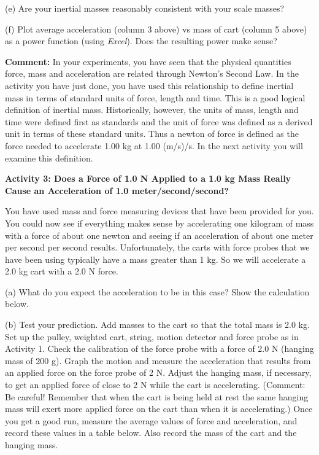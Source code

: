 {(e) Are your inertial masses reasonably consistent with your scale masses?
\answerspace{10mm}

(f) Plot average acceleration (column 3 above) vs mass of cart (column 5 above) as a power function (using \textit{Excel}). Does the resulting power make sense?
\answerspace{5mm}

\textbf{Comment:} In your experiments, you have seen that the physical quantities
force, mass and acceleration are related through Newton's Second Law. In the
activity you have just done, you have used this relationship to define inertial
mass in terms of standard units of force, length and time. This is a good logical
definition of inertial mass. Historically, however, the units of mass, length
and time were defined first as standards and the unit of force was defined as
a derived unit in terms of these standard units. Thus a newton of force is defined
as the force needed to accelerate 1.00 kg at 1.00 (m/s)/s. In the next activity
you will examine this definition. 

\pagebreak[2]
\textbf{Activity 3: Does a Force of 1.0 N Applied to a 1.0 kg Mass Really Cause
an Acceleration of 1.0 meter/second/second?} 

You have used mass and force measuring devices that have been provided for you.
You could now see if everything makes sense by accelerating one kilogram of
mass with a force of about one newton and seeing if an acceleration of about
one meter per second per second results. Unfortunately, the carts with force
probes that we have been using typically have a mass greater than 1 kg. So we
will accelerate a 2.0 kg cart with a 2.0 N force.

(a) What do you expect the acceleration to be in this case? Show the calculation
below.
\vspace{20mm}

(b) Test your prediction. Add masses to the cart so that the total mass is 2.0
kg. Set up the pulley, weighted cart, string, motion detector and force probe
as in Activity 1. Check the calibration of the force probe with a force of 2.0
N (hanging mass of 200 g). Graph the motion and measure the acceleration that
results from an applied force on the force probe of 2 N. Adjust the hanging
mass, if necessary, to get an applied force of close to 2 N while the cart is
accelerating. (Comment: Be careful! Remember that when the cart is being held
at rest the same hanging mass will exert more applied force on the cart than
when it is accelerating.) Once you get a good run, measure the average values
of force and acceleration, and record these values in a table below. Also record
the mass of the cart and the hanging mass.
\vspace{30mm}

}
